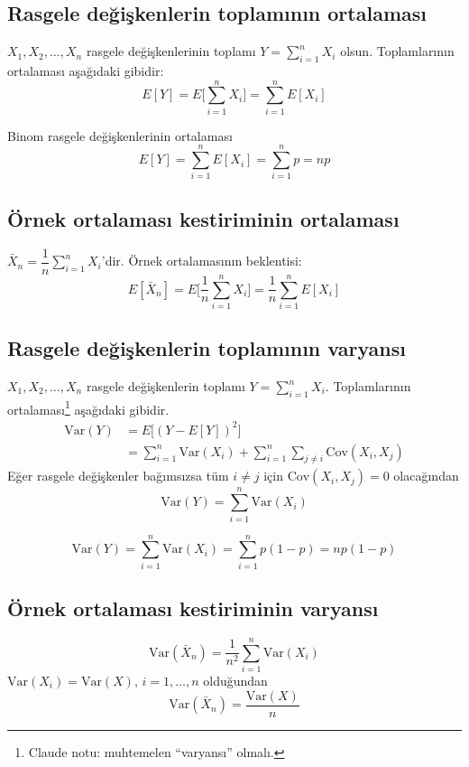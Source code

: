 \documentclass[11pt,a4paper]{article}
\begin{document}
\subsection{Rasgele değişkenlerin toplamının ortalaması}
$X_1,X_2,\ldots,X_n$ rasgele değişkenlerinin toplamı $Y=\sum_{i=1}^{n}X_i$ olsun. Toplamlarının ortalaması aşağıdaki gibidir:
\[ E[Y]=E\Big[\sum_{i=1}^{n}X_i\Big]=\sum_{i=1}^{n}E[X_i] \]
\begin{ornek}
  Binom rasgele değişkenlerinin ortalaması
  \[ E[Y]=\sum_{i=1}^{n}E[X_i]=\sum_{i=1}^{n}p=np \]
\end{ornek}

\subsection{Örnek ortalaması kestiriminin ortalaması}
$\bar{X}_n=\dfrac{1}{n}\displaystyle\sum_{i=1}^{n}X_i$'dir. Örnek ortalamasının beklentisi:
\[ E[\bar{X}_n]=E\Big[\frac{1}{n}\sum_{i=1}^{n}X_i\Big]=\frac{1}{n}\sum_{i=1}^{n}E[X_i] \]

\subsection{Rasgele değişkenlerin toplamının varyansı}
$X_1,X_2,\ldots,X_n$ rasgele değişkenlerin toplamı $Y=\sum_{i=1}^{n}X_i$. Toplamlarının ortalaması\footnote{Claude notu: muhtemelen ``varyansı'' olmalı.} aşağıdaki gibidir.
\begin{align*}
  \mathrm{Var}(Y) &= E\big[(Y-E[Y])^2\big]\\
  &= \sum_{i=1}^{n}\mathrm{Var}(X_i)+\sum_{i=1}^{n}\sum_{j\neq i}\mathrm{Cov}(X_i,X_j)
\end{align*}
Eğer rasgele değişkenler bağımsızsa tüm $i\neq j$ için $\mathrm{Cov}(X_i,X_j)=0$ olacağından
\[ \mathrm{Var}(Y)=\sum_{i=1}^{n}\mathrm{Var}(X_i) \]
\begin{ornek}
  \[ \mathrm{Var}(Y)=\sum_{i=1}^{n}\mathrm{Var}(X_i)=\sum_{i=1}^{n}p(1-p)=np(1-p) \]
\end{ornek}

\subsection{Örnek ortalaması kestiriminin varyansı}
\[ \mathrm{Var}(\bar{X}_n)=\frac{1}{n^2}\sum_{i=1}^{n}\mathrm{Var}(X_i) \]
$\mathrm{Var}(X_i)=\mathrm{Var}(X)$, $i=1,\ldots,n$ olduğundan
\[ \mathrm{Var}(\bar{X}_n)=\frac{\mathrm{Var}(X)}{n} \]
\end{document}

